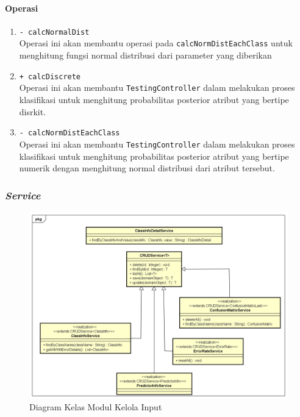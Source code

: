\begin{enumerate}
	\paragraph{Operasi}
		\begin{enumerate}
			\item \texttt{- calcNormalDist}\\
			Operasi ini akan membantu operasi pada \texttt{calcNormDistEachClass} untuk menghitung fungsi normal distribusi dari parameter yang diberikan
			
			\item \texttt{+ calcDiscrete}\\
			Operasi ini akan membantu \texttt{TestingController} dalam melakukan proses klasifikasi untuk menghitung probabilitas posterior atribut yang bertipe disrkit.

			\item \texttt{- calcNormDistEachClass}\\
			Operasi ini akan membantu \texttt{TestingController} dalam melakukan proses klasifikasi untuk menghitung probabilitas posterior atribut yang bertipe numerik dengan menghitung normal distribusi dari atribut tersebut.

		\end{enumerate}
		
		


\end{enumerate}
	

\subsubsection{\textit{Service}}
\begin{figure}[H]
	\centering
	\includegraphics[scale=0.55]{ClassDiagramLengkap/Klasifikasi/Simple_CD_Klasifikasi_Services}
	\caption[Diagram Kelas Modul Kelola Input]{Diagram Kelas Modul Kelola Input}
	\label{fig:Diagram Kelas Modul Kelola Input}
\end{figure}


